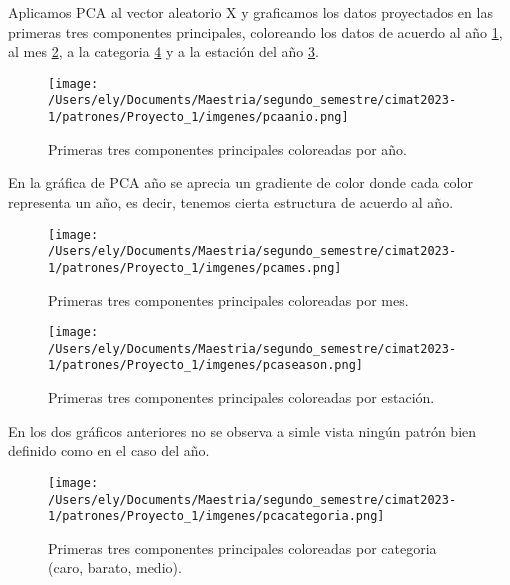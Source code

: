 \documentclass[letterpaper,spanish,reprint,nofootinbib,showkeys,aps]{revtex4-2}
\begin{document}
Aplicamos PCA al vector aleatorio X y graficamos los datos proyectados en las primeras tres componentes principales, coloreando los datos de acuerdo al año \ref{pcaanio}, al mes \ref{pcames}, a la categoria \ref{pcacategoria} y a la estación del año \ref{pcaseason}.


\begin{figure} [H]
	\begin{center}
		\texttt{[image: /Users/ely/Documents/Maestria/segundo\_semestre/cimat2023-1/patrones/Proyecto\_1/imgenes/pcaanio.png]}
		\caption{Primeras tres componentes principales coloreadas por año.}
		\label{pcaanio} 
   \end{center} 
\end{figure} 

En la gráfica de PCA año se aprecia un gradiente de color donde cada color representa un año, es decir, tenemos cierta estructura de acuerdo al año.



\begin{figure} [H]
	\begin{center}
		\texttt{[image: /Users/ely/Documents/Maestria/segundo\_semestre/cimat2023-1/patrones/Proyecto\_1/imgenes/pcames.png]}
		\caption{Primeras tres componentes principales coloreadas por mes.}
		\label{pcames} 
   \end{center} 
\end{figure} 



\begin{figure} [H]
	\begin{center}
		\texttt{[image: /Users/ely/Documents/Maestria/segundo\_semestre/cimat2023-1/patrones/Proyecto\_1/imgenes/pcaseason.png]}
		\caption{Primeras tres componentes principales coloreadas por estación.}
		\label{pcaseason} 
   \end{center} 
\end{figure} 


En los dos gráficos anteriores no se observa a simle vista ningún patrón bien definido como en el caso del año.

\begin{figure} [H]
	\begin{center}
		\texttt{[image: /Users/ely/Documents/Maestria/segundo\_semestre/cimat2023-1/patrones/Proyecto\_1/imgenes/pcacategoria.png]}
		\caption{Primeras tres componentes principales coloreadas por categoria (caro, barato, medio).}
		\label{pcacategoria} 
   \end{center} 
\end{figure} 
\end{document}
